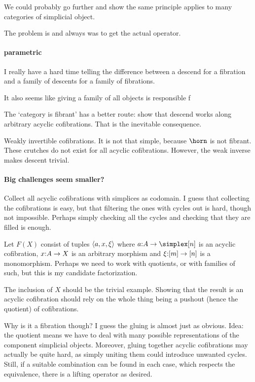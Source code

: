 \documentclass[csh.tex]{subfiles}
\begin{document}
We could probably go further and show the same principle applies to many categories of simplicial object.

The problem is and always was to get the actual operator.

\paragraph{parametric}
I really have a hard time telling the difference between a descend for a fibration and a family of descents for a family of fibrations.

It also seems like giving a family of all objects is responsible f

The `category is fibrant' has a better route: show that descend works along arbitrary acyclic cofibrations. That is the inevitable consequence.

Weakly invertible cofibrations. It is not that simple, because $\horn$ is not fibrant. These crutches do not exist for all acyclic cofibrations. However, the weak inverse makes descent trivial.


\paragraph{Big challenges seem smaller?}
Collect all acyclic cofibrations with simplices as codomain.
I guess that collecting the cofibrations is easy, but that filtering the ones with cycles out is hard, though not impossible. Perhaps simply checking all the cycles and checking that they are filled is enough.

Let $F(X)$ consist of tuples $\left\langle a,x,\xi \right\rangle$ where $a\of A\to\simplex[n]$ is an acyclic cofibration, $x\mathord : A\to X$ is an arbitrary morphism and $\xi\mathord : [m]\to [n]$ is a monomorphism.
Perhaps we need to work with quotients, or with families of such, but this is my candidate factorization.

The inclusion of $X$ should be the trivial example. Showing that the result is an acyclic cofibration should rely on the whole thing being a pushout (hence the quotient) of cofibrations.

Why is it a fibration though?
I guess the gluing is almost just as obvious. Idea: the quotient means we have to deal with many possible representations of the component simplicial objects. Moreover, gluing together acyclic cofibrations may actually be quite hard, as simply uniting them could introduce unwanted cycles. Still, if a suitable combination can be found in each case, which respects the equivalence, there is a lifting operator as desired.
\end{document}
